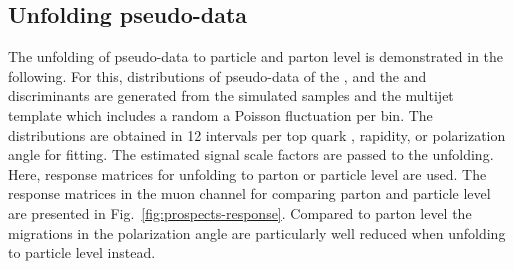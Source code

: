 

\subsection{Unfolding pseudo-data}

The unfolding of pseudo-data to particle and parton level is demonstrated in the following. For this, distributions of pseudo-data of the \mtw, and the \bdttt and \bdttch discriminants are generated from the simulated samples and the multijet template which includes a random a Poisson fluctuation per bin. The distributions are obtained in 12 intervals per top quark \pt, rapidity, or polarization angle for fitting. The estimated signal scale factors are passed to the unfolding. Here, response matrices for unfolding to parton or particle level are used. The response matrices in the muon channel for comparing parton and particle level are presented in Fig.~\ref{fig:prospects-response}. Compared to parton level the migrations in the polarization angle are particularly well reduced when unfolding to particle level instead.

